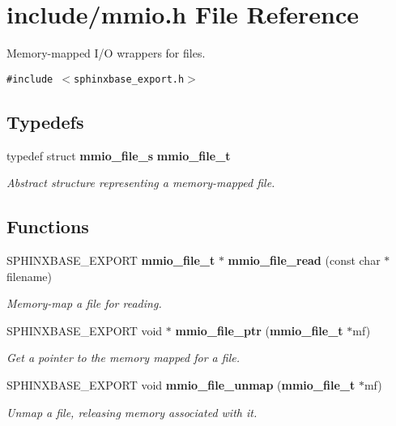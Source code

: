 \section{include/mmio.h File Reference}
\label{mmio_8h}
Memory-mapped I/O wrappers for files.  


{\tt \#include $<$sphinxbase\_\-export.h$>$}\par
\subsection*{Typedefs}
\begin{CompactItemize}
\item 
typedef struct {\bf mmio\_\-file\_\-s} {\bf mmio\_\-file\_\-t}\label{mmio_8h_e27ed04d8142d77aae885c8cb8c9fa3b}

\begin{CompactList}\small\item\em Abstract structure representing a memory-mapped file. \item\end{CompactList}\end{CompactItemize}
\subsection*{Functions}
\begin{CompactItemize}
\item 
SPHINXBASE\_\-EXPORT {\bf mmio\_\-file\_\-t} $\ast$ {\bf mmio\_\-file\_\-read} (const char $\ast$filename)
\begin{CompactList}\small\item\em Memory-map a file for reading. \item\end{CompactList}\item 
SPHINXBASE\_\-EXPORT void $\ast$ {\bf mmio\_\-file\_\-ptr} ({\bf mmio\_\-file\_\-t} $\ast$mf)\label{mmio_8h_5e6d8bf5cd7785563abc18c70a31ce0d}

\begin{CompactList}\small\item\em Get a pointer to the memory mapped for a file. \item\end{CompactList}\item 
SPHINXBASE\_\-EXPORT void {\bf mmio\_\-file\_\-unmap} ({\bf mmio\_\-file\_\-t} $\ast$mf)\label{mmio_8h_341a9c1cc8a3c4bddfd2d29a1b0993f6}

\begin{CompactList}\small\item\em Unmap a file, releasing memory associated with it. \item\end{CompactList}\end{CompactItemize}


